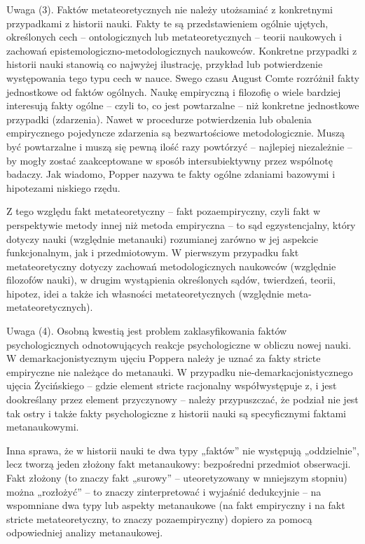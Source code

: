 \documentclass{article}
\begin{document}
Uwaga (3). Faktów metateoretycznych nie należy utożsamiać z konkretnymi przypadkami z historii nauki. Fakty te są
przedstawieniem ogólnie ujętych, określonych cech – ontologicznych lub metateoretycznych – teorii naukowych i zachowań
epistemologiczno-metodologicznych naukowców. Konkretne przypadki z historii nauki stanowią co najwyżej ilustrację,
przykład lub potwierdzenie występowania tego typu cech w nauce. Swego czasu August Comte rozróżnił fakty jednostkowe od
faktów ogólnych. Naukę empiryczną i filozofię o wiele bardziej interesują fakty ogólne – czyli to, co jest powtarzalne
– niż konkretne jednostkowe przypadki (zdarzenia). Nawet w procedurze potwierdzenia lub obalenia empirycznego
pojedyncze zdarzenia są bezwartościowe metodologicznie. Muszą być powtarzalne i muszą się pewną ilość razy powtórzyć –
najlepiej niezależnie – by mogły zostać zaakceptowane w sposób intersubiektywny przez wspólnotę badaczy. Jak wiadomo,
Popper nazywa te fakty ogólne zdaniami bazowymi i hipotezami niskiego rzędu.

Z tego względu fakt metateoretyczny – fakt pozaempiryczny, czyli fakt w perspektywie metody innej niż metoda empiryczna
– to sąd egzystencjalny, który dotyczy nauki (względnie metanauki) rozumianej zarówno w jej aspekcie funkcjonalnym, jak
i przedmiotowym. W pierwszym przypadku fakt metateoretyczny dotyczy zachowań metodologicznych naukowców (względnie
filozofów nauki), w drugim wystąpienia określonych sądów, twierdzeń, teorii, hipotez, idei a także ich własności
metateoretycznych (względnie meta-metateoretycznych).

Uwaga (4). Osobną kwestią jest problem zaklasyfikowania faktów psychologicznych odnotowujących reakcje psychologiczne w
obliczu nowej nauki. W demarkacjonistycznym ujęciu Poppera należy je uznać za fakty stricte empiryczne nie należące do
metanauki. W przypadku nie-demarkacjonistycznego ujęcia Życińskiego – gdzie element stricte racjonalny współwystępuje
z, i jest dookreślany przez element przyczynowy – należy przypuszczać, że podział nie jest tak ostry i także fakty
psychologiczne z historii nauki są specyficznymi faktami metanaukowymi.

Inna sprawa, że w historii nauki te dwa typy „faktów” nie występują „oddzielnie”, lecz tworzą jeden złożony fakt
metanaukowy: bezpośredni przedmiot obserwacji. Fakt złożony (to znaczy fakt „surowy” – uteoretyzowany w mniejszym
stopniu) można „rozłożyć” – to znaczy zinterpretować i wyjaśnić dedukcyjnie – na wspomniane dwa typy lub aspekty
metanaukowe (na fakt empiryczny i na fakt stricte metateoretyczny, to znaczy pozaempiryczny) dopiero za pomocą
odpowiedniej analizy metanaukowej.
\end{document}
